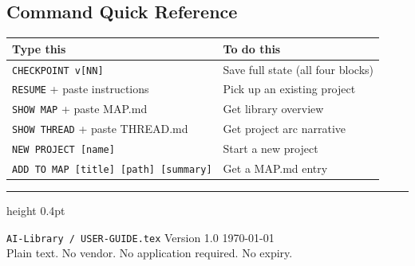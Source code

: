 \documentclass[12pt,letterpaper]{article}
\begin{document}
\subsection{Command Quick Reference}

\begin{center}
\begin{tabular}{@{}ll@{}}
\toprule
\textbf{Type this} & \textbf{To do this} \\
\midrule
\texttt{CHECKPOINT v[NN]} & Save full state (all four blocks) \\
\texttt{RESUME} + paste instructions & Pick up an existing project \\
\texttt{SHOW MAP} + paste MAP.md & Get library overview \\
\texttt{SHOW THREAD} + paste THREAD.md & Get project arc narrative \\
\texttt{NEW PROJECT [name]} & Start a new project \\
\texttt{ADD TO MAP [title] [path] [summary]} & Get a MAP.md entry \\
\bottomrule
\end{tabular}
\end{center}

\vspace{16pt}
\hrule height 0.4pt
\vspace{12pt}

\begin{center}
{\small\texttt{AI-Library / USER-GUIDE.tex} \quad Version 1.0 \quad \today}\\[4pt]
{\small Plain text. No vendor. No application required. No expiry.}
\end{center}
\end{document}
